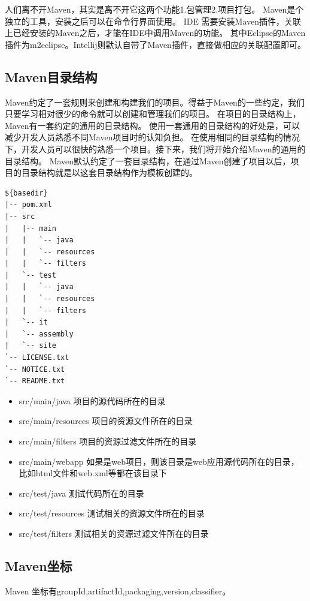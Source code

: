 \documentclass{book}
\begin{document}
人们离不开Maven，其实是离不开它这两个功能1.包管理2.项目打包。
Maven是个独立的工具，安装之后可以在命令行界面使用。
IDE 需要安装Maven插件，关联上已经安装的Maven之后，才能在IDE中调用Maven的功能。
其中Eclipse的Maven插件为m2eclipse。Intellij则默认自带了Maven插件，直接做相应的关联配置即可。

\subsection{Maven目录结构}

Maven约定了一套规则来创建和构建我们的项目。得益于Maven的一些约定，我们只要学习相对很少的命令就可以创建和管理我们的项目。
在项目的目录结构上，Maven有一套约定的通用的目录结构。
使用一套通用的目录结构的好处是，可以减少开发人员熟悉不同Maven项目时的认知负担。
在使用相同的目录结构的情况下，开发人员可以很快的熟悉一个项目。接下来，我们将开始介绍Maven的通用的目录结构。
Maven默认约定了一套目录结构，在通过Maven创建了项目以后，项目的目录结构就是以这套目录结构作为模板创建的。

\begin{lstlisting}
${basedir}
|-- pom.xml
|-- src
|   |-- main
|   |   `-- java
|   |   `-- resources
|   |   `-- filters
|   `-- test
|   |   `-- java
|   |   `-- resources
|   |   `-- filters
|   `-- it
|   `-- assembly
|   `-- site
`-- LICENSE.txt
`-- NOTICE.txt
`-- README.txt
\end{lstlisting}


\begin{itemize}
	\item{src/main/java 项目的源代码所在的目录}
	\item{src/main/resources 项目的资源文件所在的目录}
	\item{src/main/filters 项目的资源过滤文件所在的目录}
	\item{src/main/webapp 如果是web项目，则该目录是web应用源代码所在的目录，比如html文件和web.xml等都在该目录下}
	\item{src/test/java 测试代码所在的目录}
	\item{src/test/resources 测试相关的资源文件所在的目录}
	\item{src/test/filters 测试相关的资源过滤文件所在的目录}
\end{itemize} 

\subsection{Maven坐标}

Maven 坐标有groupId,artifactId,packaging,version,classifier。
\end{document}
